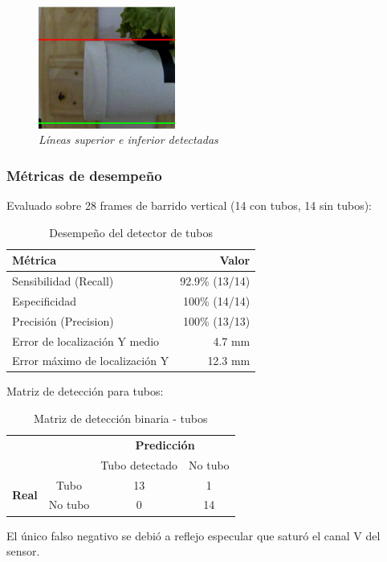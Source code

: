 \begin{figure}[H]
    \centering
    \includegraphics[width=0.4\textwidth]{imagenes/detector_tubos_6_lineas.png}
    \caption{\textit{Líneas superior e inferior detectadas}}
    \label{fig:detector_tubos_lineas}
\end{figure}

\subsubsection{Métricas de desempeño}
Evaluado sobre 28 frames de barrido vertical (14 con tubos, 14 sin tubos):

\begin{table}[H]
\centering
\begin{tabular}{|l|r|}
\hline
\textbf{Métrica} & \textbf{Valor} \\ \hline
Sensibilidad (Recall) & 92.9\% (13/14) \\ \hline
Especificidad & 100\% (14/14) \\ \hline
Precisión (Precision) & 100\% (13/13) \\ \hline
Error de localización Y medio & 4.7 mm \\ \hline
Error máximo de localización Y & 12.3 mm \\ \hline
\end{tabular}
\caption{Desempeño del detector de tubos}
\label{tab:metricas_tubos}
\end{table}

Matriz de detección para tubos:

\begin{table}[H]
\centering
\begin{tabular}{cc|c|c|}
\cline{3-4}
& & \multicolumn{2}{c|}{\textbf{Predicción}} \\ \cline{3-4}
& & Tubo detectado & No tubo \\ \hline
\multicolumn{1}{|c|}{\multirow{2}{*}{\textbf{Real}}} & Tubo & 13 & 1 \\ \cline{2-4}
\multicolumn{1}{|c|}{} & No tubo & 0 & 14 \\ \hline
\end{tabular}
\caption{Matriz de detección binaria - tubos}
\label{tab:confusion_tubos}
\end{table}

\noindent
El único falso negativo se debió a reflejo especular que saturó el canal V del sensor.
